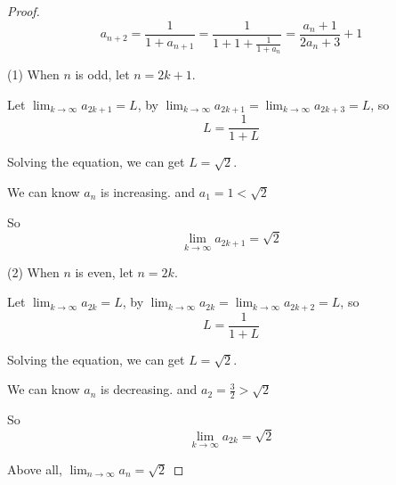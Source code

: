 \documentclass{article}
\begin{document}
    \begin{proof}

        $$a_{n+2} = \frac{1}{1 + a_{n+1}} = \frac{1}{1 + 1 + \frac{1}{1 + a_n}} = \frac{a_n + 1}{2a_n + 3} + 1$$



        (1) When $n$ is odd, let $n = 2k + 1$.

        Let $\lim_{k \to \infty}a_{2k + 1} = L$, by $\lim_{k \to \infty}a_{2k + 1} = \lim_{k \to \infty}a_{2k + 3} = L$, so $$L = \frac{1}{1 + L}$$

        Solving the equation, we can get $L = \sqrt{2}$.

        We can know $a_n$ is increasing. and $a_1 = 1 < \sqrt 2$

        So $$\lim_{k \to \infty}a_{2k + 1} = \sqrt{2}$$

        (2) When $n$ is even, let $n = 2k$.

        Let $\lim_{k \to \infty}a_{2k} = L$, by $\lim_{k \to \infty}a_{2k} = \lim_{k \to \infty}a_{2k + 2} = L$, so $$L = \frac{1}{1 + L}$$

        Solving the equation, we can get $L = \sqrt{2}$.

        We can know $a_n$ is decreasing. and $a_2 = \frac 3 2 > \sqrt 2$

        So $$\lim_{k \to \infty}a_{2k} = \sqrt{2}$$

        Above all, $\lim_{n \to \infty}a_n = \sqrt{2}$

    \end{proof}
\end{document}
